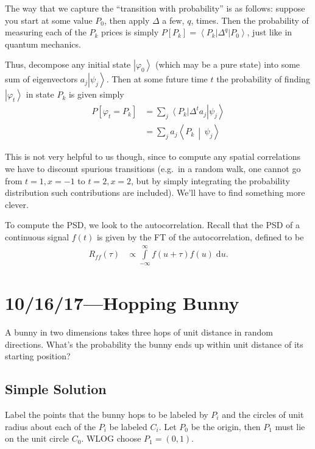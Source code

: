 \documentclass[12pt]{report}
\newcommand*{\dotp}[2]{\left<#1\,\middle|\,#2\right>}
\newcommand*{\bra}[1]{\left<#1\right|}
\newcommand*{\ket}[1]{\left|#1\right>}
\begin{document}
The way that we capture the ``transition with probability'' is as follows:
suppose you start at some value $P_0$, then apply $\Delta$ a few, $q$,
times. Then the probability of measuring each of the $P_k$ prices is simply
$P[P_k] = \bra{P_k}\Delta^q\ket{P_0}$, just like in quantum mechanics.

Thus, decompose any initial state $\ket{\varphi_0}$ (which may be a pure state)
into some sum of eigenvectors $a_j\ket{\psi_j}$. Then at some future time $t$
the probability of finding $\ket{\varphi_t}$ in state $P_k$ is given simply
\begin{align}
    P[\varphi_t = P_k]
        &= \sum\limits_{j}^{} \bra{P_k}\Delta^t a_j\ket{\psi_j} \nonumber\\
        &= \sum\limits_{j}^{} a_j\dotp{P_k}{\psi_j}
\end{align}

This is not very helpful to us though, since to compute any spatial correlations
we have to discount spurious transitions (e.g.\ in a random walk, one cannot go
from $t=1, x=-1$ to $t=2, x=2$, but by simply integrating the probability
distribution such contributions are included). We'll have to find something more
clever.

To compute the PSD, we look to the autocorrelation. Recall that the PSD of a
continuous signal $f(t)$ is given by the FT of the autocorrelation, defined to
be
\begin{align}
    R_{ff}(\tau) &\propto \int\limits_{-\infty}^{\infty}f(u + \tau) f(u)
        \;\mathrm{d}u.
\end{align}

\chapter{10/16/17---Hopping Bunny}

A bunny in two dimensions takes three hops of unit distance in random
directions. What's the probability the bunny ends up within unit distance of its
starting position?

\section{Simple Solution}\label{s:10/16/17.simple}

Label the points that the bunny hops to be labeled by $P_i$ and the circles of
unit radius about each of the $P_i$ be labeled $C_i$. Let $P_0$ be the origin,
then $P_1$ must lie on the unit circle $C_0$. WLOG choose $P_1 = (0, 1)$.
\end{document}
